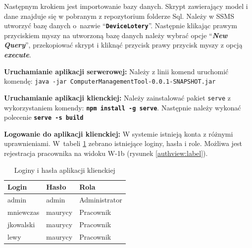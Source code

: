 Następnym krokiem jest importowanie bazy danych. Skrypt zawierający model i dane znajduje się w pobranym z repozytorium folderze Sql. Należy w SSMS utworzyć bazę danych o~nazwie "`\textbf{\texttt{DeviceLotery}}"'. Następnie klikając prawym przyciskiem myszy na utworzoną bazę danych należy wybrać opcje "`\textbf{\emph{New Query}}"', przekopiować skrypt i kliknąć przycisk prawy przycisk myszy z opcją \textbf{\emph{execute}}.

\noindent \textbf{Uruchamianie aplikacji serwerowej:}
Należy z linii komend uruchomić komendę: \mbox{\texttt{java -jar ComputerManagementTool-0.0.1-SNAPSHOT.jar}}

\noindent \textbf{Uruchamianie aplikacji klienckiej:}
Należy zainstalować pakiet \texttt{serve} z wykorzystaniem komendy: \textbf{\texttt{npm install -g serve}}. Następnie należy wykonać polecenie \textbf{\texttt{serve -s build}}

\noindent \textbf{Logowanie do aplikacji klienckiej:}
W systemie istnieją konta z różnymi uprawnieniami. W~tabeli \ref{tab:loginKlient} zebrano istniejące loginy, hasła i role. Możliwa jest rejestracja pracownika na widoku W-1b (rysunek \ref{authview:label}).
 

\begin{table}[htb] \small
	\centering
\caption{Loginy i hasła aplikacji klienckiej}
\label{tab:loginKlient}
\begin{tabularx}{0.5\linewidth}{|X|X|X|}
		\hline
    Login & Hasło & Rola \\
		\hline
    admin & admin & Administrator\\
    \hline
    mniewczas & maurycy & Pracownik \\
    \hline
    jkowalski & maurycy &  Pracownik \\
    \hline
    lewy & maurycy & Pracownik \\
    \hline
\end{tabularx}
\end{table}




















